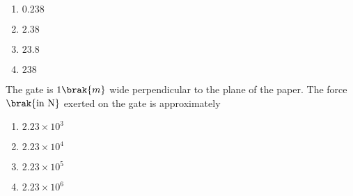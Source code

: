 \begin{enumerate}
    \item $0.238$
    \item $2.38$
    \item $23.8$
    \item $238$
\end{enumerate}
\item The gate is $1 \brak{m}$ wide perpendicular to the plane of the paper. The force $\brak{\text{in N}}$ exerted on the gate is approximately
\begin{enumerate}
    \item $2.23\times10^3$
    \item $2.23\times10^4$
    \item $2.23\times10^5$
    \item $2.23\times10^6$
\end{enumerate}
%

